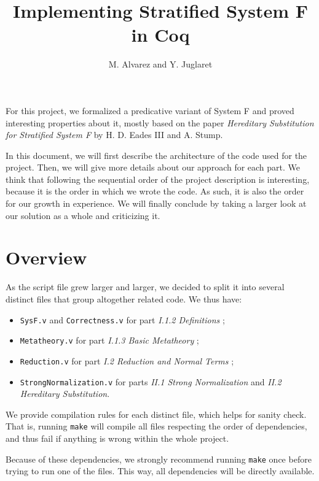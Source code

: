 \documentclass[a4paper,11pt]{article}
\begin{document}
\title{Implementing Stratified System F in Coq}
\author{M. Alvarez and Y. Juglaret}
\date{}
\maketitle

For this project, we formalized a predicative variant of System F and
proved interesting properties about it, mostly based on the paper
\emph{Hereditary Substitution for Stratified System F} by H. D. Eades
III and A. Stump.

In this document, we will first describe the architecture of the code
used for the project. Then, we will give more details about our
approach for each part. We think that following the sequential order
of the project description is interesting, because it is the order in
which we wrote the code. As such, it is also the order for our growth
in experience. We will finally conclude by taking a larger look at our
solution as a whole and criticizing it.

\section*{Overview}

As the script file grew larger and larger, we decided to split it into
several distinct files that group altogether related code. We thus
have:

\begin{itemize}
  \item \verb|SysF.v| and \verb|Correctness.v| for part \emph{I.1.2
    Definitions} ;
  \item \verb|Metatheory.v| for part \emph{I.1.3 Basic Metatheory} ;
  \item \verb|Reduction.v| for part \emph{I.2 Reduction and Normal
    Terms} ;
  \item \verb|StrongNormalization.v| for parts \emph{II.1 Strong
    Normalization} and \emph{II.2 Hereditary Substitution}.
\end{itemize}

We provide compilation rules for each distinct file, which helps
for sanity check. That is, running \verb|make| will compile all files
respecting the order of dependencies, and thus fail if anything is
wrong within the whole project.

Because of these dependencies, we strongly recommend running
\verb|make| once before trying to run one of the files. This way, all
dependencies will be directly available.
\end{document}
